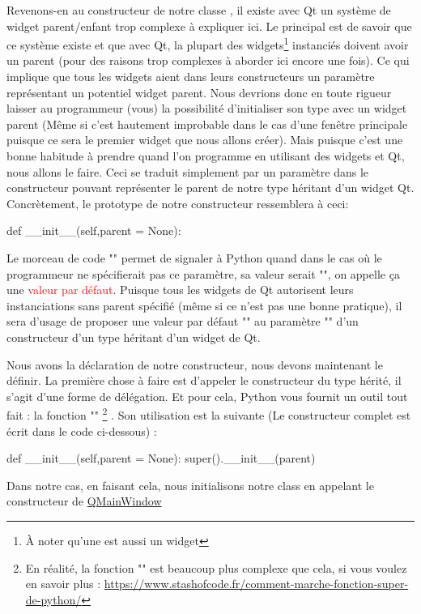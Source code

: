 \documentclass[12pt]{report}    %
\begin{document}
Revenons-en au constructeur de notre classe , il existe avec Qt un système de widget parent/enfant trop complexe à expliquer ici. Le principal est de savoir que ce système existe et que avec Qt, la plupart des widgets\footnote{À noter qu'une  est aussi un widget} instanciés doivent avoir un parent (pour des raisons trop complexes à aborder ici encore une fois). Ce qui implique que tous les widgets aient dans leurs constructeurs un paramètre représentant un potentiel widget parent.\vskip 0cm %
Nous devrions donc en toute rigueur laisser au programmeur (vous) la possibilité d'initialiser son type avec un widget parent (Même si c'est hautement improbable dans le cas d'une fenêtre principale puisque ce sera le premier widget que nous allons créer). Mais puisque c'est une bonne habitude à prendre quand l'on programme en utilisant des widgets et Qt, nous allons le faire.\newline
Ceci se traduit simplement par un paramètre  dans le constructeur pouvant représenter le parent de notre type héritant d'un widget Qt.\newline
Concrètement, le prototype de notre constructeur ressemblera à ceci:
\begin{pyCode}
def __init__(self,parent = None):
\end{pyCode}
Le morceau de code "" permet de signaler à Python quand dans le cas où le programmeur ne spécifierait pas ce paramètre, sa valeur serait "", on appelle ça une \textcolor{red}{valeur par défaut}.\newline
Puisque tous les widgets de Qt autorisent leurs instanciations sans parent spécifié (même si ce n'est pas une bonne pratique), il sera d'usage de proposer une valeur par défaut "" au paramètre "" d'un constructeur d'un type héritant d'un widget de Qt.\smallSkip

Nous avons la déclaration de notre constructeur, nous devons maintenant le définir.\newline
La première chose à faire est d'appeler le constructeur du type hérité, il s'agit d'une forme de délégation. Et pour cela, Python vous fournit un outil tout fait : la fonction ""
\footnote
{
En réalité, la fonction "" est beaucoup plus complexe que cela, si vous voulez en savoir plus : \url{https://www.stashofcode.fr/comment-marche-fonction-super-de-python/}
}
. Son utilisation est la suivante (Le constructeur complet est écrit dans le code ci-dessous) :
\begin{pyCode}
def __init__(self,parent = None):
		super().__init__(parent)
\end{pyCode}
Dans notre cas, en faisant cela, nous initialisons notre class en appelant le constructeur de \href{https://doc.qt.io/qt-5/qmainwindow.html}{QMainWindow}\newpage
\end{document}
